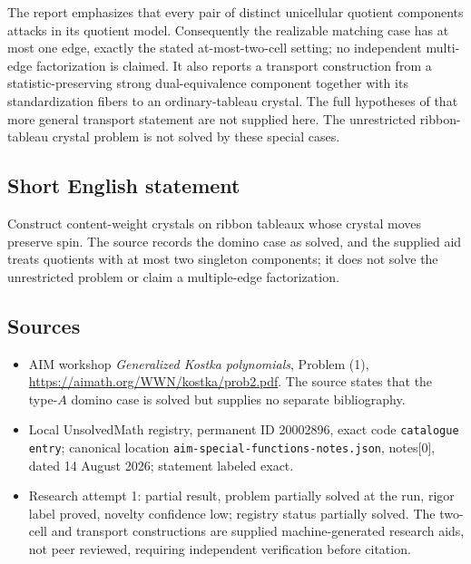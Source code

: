 \documentclass[11pt]{article}
\begin{document}
The report emphasizes that every pair of distinct unicellular quotient components attacks in its quotient model. Consequently the realizable matching case has at most one edge, exactly the stated at-most-two-cell setting; no independent multi-edge factorization is claimed. It also reports a transport construction from a statistic-preserving strong dual-equivalence component together with its standardization fibers to an ordinary-tableau crystal. The full hypotheses of that more general transport statement are not supplied here. The unrestricted ribbon-tableau crystal problem is not solved by these special cases.
\subsection{Short English statement}
Construct content-weight crystals on ribbon tableaux whose crystal moves preserve spin. The source records the domino case as solved, and the supplied aid treats quotients with at most two singleton components; it does not solve the unrestricted problem or claim a multiple-edge factorization.
\subsection{Sources}
\begin{itemize}
\item AIM workshop \emph{Generalized Kostka polynomials}, Problem (1), \url{https://aimath.org/WWN/kostka/prob2.pdf}. The source states that the type-\(A\) domino case is solved but supplies no separate bibliography.
\item Local UnsolvedMath registry, permanent ID 20002896, exact code \texttt{catalogue entry}; canonical location \texttt{aim-special-functions-notes.json}, notes[0], dated 14 August 2026; statement labeled exact.
\item Research attempt 1: partial result, problem partially solved at the run, rigor label proved, novelty confidence low; registry status partially solved. The two-cell and transport constructions are supplied machine-generated research aids, not peer reviewed, requiring independent verification before citation.
\end{itemize}
\end{document}
